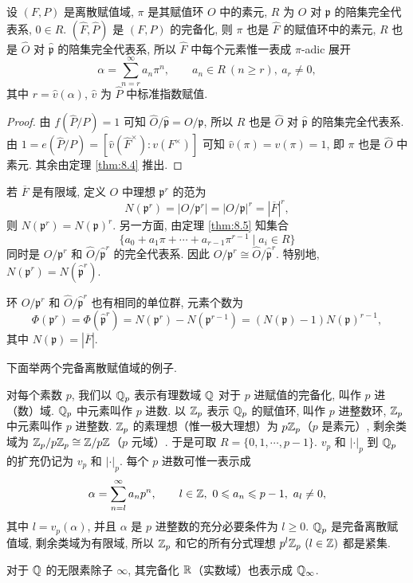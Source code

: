 \begin{theorem}\label{thm:8.5}
设 $(F,P)$ 是离散赋值域, $\pi$ 是其赋值环 $O$ 中的素元, $R$ 为 $O$ 对 $\mathfrak{p}$ 的陪集完全代表系, $0\in R$. $(\widehat{F},\widehat{P})$ 是 $(F,P)$ 的完备化, 则 $\pi$ 也是 $\widehat{F}$ 的赋值环中的素元, $R$ 也是 $\widehat{O}$ 对 $\widehat{\mathfrak{p}}$ 的陪集完全代表系, 所以 $\widehat{F}$ 中每个元素惟一表成 $\pi$-adic 展开
\[
  \alpha=\sum_{n=r}^{\infty}a_n\pi^n,\qquad a_n\in R\ (n\geqslant r),\ a_r\neq 0,
\]
其中 $r=\widehat{v}(\alpha)$, $\widehat{v}$ 为 $\widehat{P}$ 中标准指数赋值.
\end{theorem}

\begin{proof}
由 $f(\widehat{P}/P)=1$ 可知 $\widehat{O}/\widehat{\mathfrak{p}}=O/\mathfrak{p}$, 所以 $R$ 也是 $\widehat{O}$ 对 $\widehat{\mathfrak{p}}$ 的陪集完全代表系. 由 $1=e(\widehat{P}/P)=[\widehat{v}(\widehat{F}^{\times}):v(F^{\times})]$ 可知 $\widehat{v}(\pi)=v(\pi)=1$, 即 $\pi$ 也是 $\widehat{O}$ 中素元. 其余由定理 \ref{thm:8.4} 推出.
\end{proof}

\begin{remark}
若 $\overline{F}$ 是有限域, 定义 $O$ 中理想 $\mathfrak{p}^r$ 的范为
\[
  N(\mathfrak{p}^r)=|O/\mathfrak{p}^r|=|O/\mathfrak{p}|^r=|\overline{F}|^r,
\]
则 $N(\mathfrak{p}^r)=N(\mathfrak{p})^r$. 另一方面, 由定理 \ref{thm:8.5} 知集合
\[
  \{a_0+a_1\pi+\cdots+a_{r-1}\pi^{r-1}\mid a_i\in R\}
\]
同时是 $O/\mathfrak{p}^r$ 和 $\widehat{O}/\widehat{\mathfrak{p}}^r$ 的完全代表系. 因此 $O/\mathfrak{p}^r\cong\widehat{O}/\widehat{\mathfrak{p}}^r$. 特别地, $N(\mathfrak{p}^r)=N(\widehat{\mathfrak{p}}^r)$.

环 $O/\mathfrak{p}^r$ 和 $\widehat{O}/\widehat{\mathfrak{p}}^r$ 也有相同的单位群, 元素个数为
\[
  \Phi(\mathfrak{p}^r)=\Phi(\widehat{\mathfrak{p}}^r)=N(\mathfrak{p}^r)-N(\mathfrak{p}^{r-1})
  =(N(\mathfrak{p})-1)N(\mathfrak{p})^{r-1},
\]
其中 $N(\mathfrak{p})=|\overline{F}|$.
\end{remark}

下面举两个完备离散赋值域的例子.

\begin{example}
对每个素数 $p$, 我们以 $\mathbb{Q}_p$ 表示有理数域 $\mathbb{Q}$ 对于 $p$ 进赋值的完备化, 叫作 $p$ 进（数）域. $\mathbb{Q}_p$ 中元素叫作 $p$ 进数. 以 $\mathbb{Z}_p$ 表示 $\mathbb{Q}_p$ 的赋值环, 叫作 $p$ 进整数环, $\mathbb{Z}_p$ 中元素叫作 $p$ 进整数. $\mathbb{Z}_p$ 的素理想（惟一极大理想）为 $p\mathbb{Z}_p$（$p$ 是素元）, 剩余类域为 $\mathbb{Z}_p/p\mathbb{Z}_p\cong\mathbb{Z}/p\mathbb{Z}$（$p$ 元域）. 于是可取 $R=\{0,1,\cdots,p-1\}$. $v_p$ 和 $|\cdot|_p$ 到 $\mathbb{Q}_p$ 的扩充仍记为 $v_p$ 和 $|\cdot|_p$. 每个 $p$ 进数可惟一表示成
\[
  \alpha=\sum_{n=l}^{\infty}a_np^n,\qquad l\in\Z,\ 0\leqslant a_n\leqslant p-1,\ a_l\neq 0,
\]
其中 $l=v_p(\alpha)$, 并且 $\alpha$ 是 $p$ 进整数的充分必要条件为 $l\geqslant 0$. $\mathbb{Q}_p$ 是完备离散赋值域, 剩余类域为有限域, 所以 $\mathbb{Z}_p$ 和它的所有分式理想 $p^l\mathbb{Z}_p\ (l\in\mathbb{Z})$ 都是紧集.

对于 $\mathbb{Q}$ 的无限素除子 $\infty$, 其完备化 $\mathbb{R}$（实数域）也表示成 $\mathbb{Q}_{\infty}$.
\end{example}

